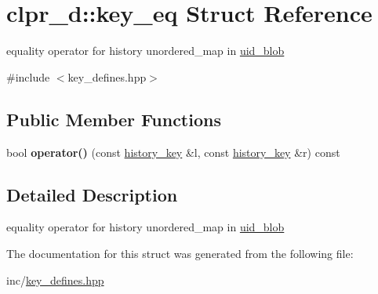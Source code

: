 \hypertarget{structclpr__d_1_1key__eq}{\section{clpr\-\_\-d\-:\-:key\-\_\-eq \-Struct \-Reference}
\label{structclpr__d_1_1key__eq}
}


equality operator for history unordered\-\_\-map in \hyperlink{classclpr__d_1_1uid__blob}{uid\-\_\-blob}  




{\ttfamily \#include $<$key\-\_\-defines.\-hpp$>$}

\subsection*{\-Public \-Member \-Functions}
\begin{DoxyCompactItemize}
\item 
\hypertarget{structclpr__d_1_1key__eq_a4116d2fa3c2088414088a9c59bf382f3}{bool {\bfseries operator()} (const \hyperlink{structclpr__d_1_1history__key}{history\-\_\-key} \&l, const \hyperlink{structclpr__d_1_1history__key}{history\-\_\-key} \&r) const }\label{structclpr__d_1_1key__eq_a4116d2fa3c2088414088a9c59bf382f3}

\end{DoxyCompactItemize}


\subsection{\-Detailed \-Description}
equality operator for history unordered\-\_\-map in \hyperlink{classclpr__d_1_1uid__blob}{uid\-\_\-blob} 

\-The documentation for this struct was generated from the following file\-:\begin{DoxyCompactItemize}
\item 
inc/\hyperlink{key__defines_8hpp}{key\-\_\-defines.\-hpp}\end{DoxyCompactItemize}

